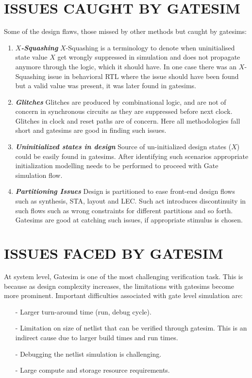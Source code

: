\section{ISSUES CAUGHT BY GATESIM}
Some of the design flaws, those missed by other methods but caught by gatesims:
\begin{enumerate}

\item \emph{\bf $X$-Squashing}
	$X$-Squashing is a terminology to denote when uninitialised state value $X$ get wrongly suppressed in simulation and does not propagate anymore through the logic, which it should have. In one case there was an $X$-Squashing issue in behavioral RTL where the issue should have been found but a valid value was present, it was later found in gatesims.

\item \emph{\bf Glitches}
	Glitches are produced by combinational logic, and are not of concern in synchronous circuits as they are suppressed before next clock. Glitches in clock and reset paths are of concern. Here all methodologies fall short and gatesims are good in finding such issues.

\item \emph{\bf Uninitialized states in design}
	Source of un-initialized design states ($X$) could be easily found in gatesims. After identifying such scenarios appropriate initialization modelling needs to be performed to proceed with Gate simulation flow.

\item \emph{\bf Partitioning Issues}
	Design is partitioned to ease front-end design flows such as synthesis, STA, layout and LEC. Such act introduces discontinuity in such flows such as wrong constraints for different partitions and so forth. Gatesims are good at catching such issues, if appropriate stimulus is chosen.

\end{enumerate}







\section{ISSUES FACED BY GATESIM}
\label{intro:sec:ifg}
At system level, Gatesim is one of the most challenging verification task. This is because as design complexity increases, the limitations with gatesims become more prominent. Important difficulties associated with gate level simulation are:
\begin{itemize}


\item[-] Larger turn-around time (run, debug cycle).
\item[-] Limitation on size of netlist that can be verified through gatesim. This is an indirect cause due to larger build times and run times.
\item[-] Debugging the netlist simulation is challenging.
\item[-] Large compute and storage resource requirements. 

\end{itemize}

